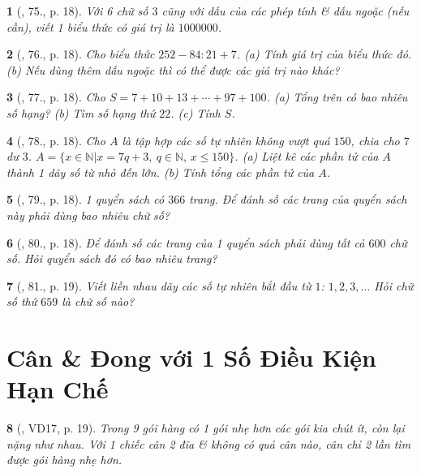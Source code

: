 \documentclass{article}
\newtheorem{baitoan}{}
\begin{document}
\begin{baitoan}[\cite{Tuyen_Toan_6}, 75., p. 18]
	Với 6 chữ số $3$ cũng với dấu của các phép tính \& dấu ngoặc (nếu cần), viết 1 biểu thức có giá trị là $1000000$.
\end{baitoan}

\begin{baitoan}[\cite{Tuyen_Toan_6}, 76., p. 18]
	Cho biểu thức $252 - 84:21 + 7$. (a) Tính giá trị của biểu thức đó. (b) Nếu dùng thêm dấu ngoặc thì có thể được các giá trị nào khác?
\end{baitoan}

\begin{baitoan}[\cite{Tuyen_Toan_6}, 77., p. 18]
	Cho $S = 7 + 10 + 13 + \cdots + 97 + 100$. (a) Tổng trên có bao nhiêu số hạng? (b) Tìm số hạng thứ $22$. (c) Tính $S$.
\end{baitoan}

\begin{baitoan}[\cite{Tuyen_Toan_6}, 78., p. 18]
	Cho $A$ là tập hợp các số tự nhiên không vượt quá $150$, chia cho $7$ dư $3$. $A = \{x\in\mathbb{N}|x = 7q + 3,\ q\in\mathbb{N},\,x\le150\}$. (a) Liệt kê các phần tử của $A$ thành 1 dãy số từ nhỏ đến lớn. (b) Tính tổng các phần tử của $A$.
\end{baitoan}

\begin{baitoan}[\cite{Tuyen_Toan_6}, 79., p. 18]
	1 quyển sách có $366$ trang. Để đánh số các trang của quyển sách này phải dùng bao nhiêu chữ số?
\end{baitoan}

\begin{baitoan}[\cite{Tuyen_Toan_6}, 80., p. 18]
	Để đánh số các trang của 1 quyển sách phải dùng tất cả $600$ chữ số. Hỏi quyển sách đó có bao nhiêu trang?
\end{baitoan}

\begin{baitoan}[\cite{Tuyen_Toan_6}, 81., p. 19]
	Viết liền nhau dãy các số tự nhiên bắt đầu từ $1$: $1,2,3,\ldots$ Hỏi chữ số thứ $659$ là chữ số nào?
\end{baitoan}


\section{Cân \& Đong với 1 Số Điều Kiện Hạn Chế}

\begin{baitoan}[\cite{Tuyen_Toan_6}, VD17, p. 19]
	Trong 9 gói hàng có 1 gói nhẹ hơn các gói kia chút ít, còn lại nặng như nhau. Với 1 chiếc cân 2 đĩa \& không có quả cân nào, cân chỉ 2 lần tìm được gói hàng nhẹ hơn.
\end{baitoan}
\end{document}
